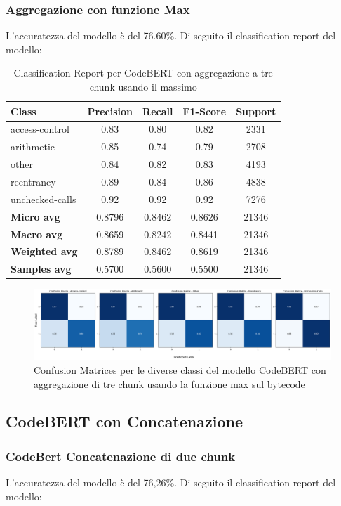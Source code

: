 \documentclass[../../Thesis.tex]{subfiles}
\begin{document}
\subsubsection{Aggregazione con funzione Max}
L'accuratezza del modello è del 76.60\%. Di seguito il classification report del modello:
\begin{table}[H]
\centering
\small
\begin{tabular}{lcccc}
\hline
\textbf{Class} & \textbf{Precision} & \textbf{Recall} & \textbf{F1-Score} & \textbf{Support} \\
\hline
access-control & 0.83 & 0.80 & 0.82 & 2331 \\
arithmetic & 0.85 & 0.74 & 0.79 & 2708 \\
other & 0.84 & 0.82 & 0.83 & 4193 \\
reentrancy & 0.89 & 0.84 & 0.86 & 4838 \\
unchecked-calls & 0.92 & 0.92 & 0.92 & 7276 \\
\hline
\textbf{Micro avg} & 0.8796 & 0.8462 & 0.8626 & 21346 \\
\textbf{Macro avg} & 0.8659 & 0.8242 & 0.8441 & 21346 \\
\textbf{Weighted avg} & 0.8789 & 0.8462 & 0.8619 & 21346 \\
\textbf{Samples avg} & 0.5700 & 0.5600 & 0.5500 & 21346 \\
\hline
\end{tabular}
\caption{Classification Report per CodeBERT con aggregazione a tre chunk usando il massimo}
\end{table}
\begin{figure}[H]
    \includegraphics[width=1.05\textwidth]{../../img/CFMax3-BC.png}
    \caption{Confusion Matrices per le diverse classi del modello CodeBERT con aggregazione di tre chunk usando la funzione max sul bytecode}
\end{figure}

\subsection{CodeBERT con Concatenazione}
\subsubsection{CodeBert Concatenazione di due chunk}
L'accuratezza del modello è del 76,26\%. Di seguito il classification report del modello:
\end{document}
